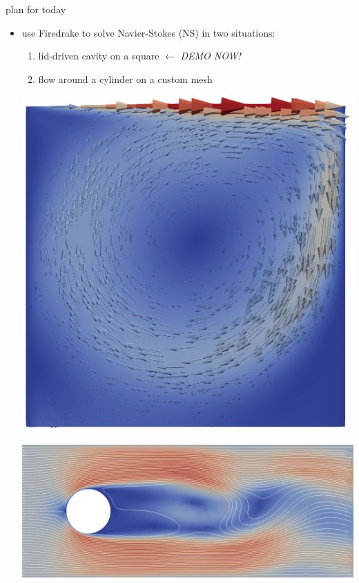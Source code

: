 \documentclass[10pt,hyperref,colorlinks]{beamer}
\begin{document}
\begin{frame}{plan for today}

\begin{itemize}
\item use Firedrake to solve Navier-Stokes (NS) in two situations:
    \begin{enumerate}
    \item lid-driven cavity on a square \hfill \alert{$\leftarrow$ \emph{DEMO NOW!}}
    \item flow around a cylinder on a custom mesh
    \end{enumerate}

\medskip
\begin{center}
\mbox{\includegraphics[height=0.33\textheight]{figs/teaser-cavity.png} \hspace{5mm} \includegraphics[height=0.32\textheight]{figs/teaser-cylinder.png}}
\end{center}


\end{itemize}
\end{frame}
\end{document}
